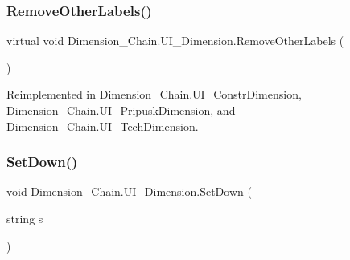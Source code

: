 \subsubsection{\texorpdfstring{Remove\+Other\+Labels()}{RemoveOtherLabels()}}
{\footnotesize\ttfamily virtual void Dimension\+\_\+\+Chain.\+U\+I\+\_\+\+Dimension.\+Remove\+Other\+Labels (\begin{DoxyParamCaption}{ }\end{DoxyParamCaption})\hspace{0.3cm}{\ttfamily [virtual]}}



Reimplemented in \mbox{\hyperlink{class_dimension___chain_1_1_u_i___constr_dimension_a376e3dccaacd2f13db6da8a7012ae0ad}{Dimension\+\_\+\+Chain.\+U\+I\+\_\+\+Constr\+Dimension}}, \mbox{\hyperlink{class_dimension___chain_1_1_u_i___pripusk_dimension_a38d5be4b36896a5ad78b93c2194a07ac}{Dimension\+\_\+\+Chain.\+U\+I\+\_\+\+Pripusk\+Dimension}}, and \mbox{\hyperlink{class_dimension___chain_1_1_u_i___tech_dimension_a7b8198570ba66a56ef0c78a8550916d2}{Dimension\+\_\+\+Chain.\+U\+I\+\_\+\+Tech\+Dimension}}.

\mbox{\label{class_dimension___chain_1_1_u_i___dimension_a95aaf2a3e9eebd27a6de7c4c2613c362}} 
\subsubsection{\texorpdfstring{Set\+Down()}{SetDown()}}
{\footnotesize\ttfamily void Dimension\+\_\+\+Chain.\+U\+I\+\_\+\+Dimension.\+Set\+Down (\begin{DoxyParamCaption}\item[{string}]{s }\end{DoxyParamCaption})}

\mbox{\label{class_dimension___chain_1_1_u_i___dimension_a3e4e1d9c20e13324015ff92665916cd1}} 
